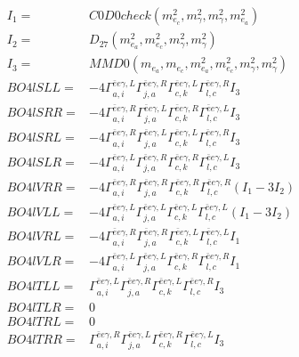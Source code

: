 \documentclass[A4,landscape]{article}
\begin{document}
\begin{align} 
I_1 = & C0D0check(m^2_{e_{{c}}}, m^2_{\gamma}, m^2_{\gamma}, m^2_{e_{{a}}}) \\ 
I_2 = & D_{27}(m^2_{e_{{a}}}, m^2_{e_{{c}}}, m^2_{\gamma}, m^2_{\gamma}) \\ 
I_3 = & MMD0(m_{e_{{a}}}, m_{e_{{c}}}, m^2_{e_{{a}}}, m^2_{e_{{c}}}, m^2_{\gamma}, m^2_{\gamma}) \\ 
  BO4lSLL= & -4  \Gamma^{\bar{e}e \gamma ,L}_{a, i} \Gamma^{\bar{e}e \gamma ,R}_{j, a} \Gamma^{\bar{e}e \gamma ,L}_{c, k} \Gamma^{\bar{e}e \gamma ,R}_{l, c} I_3 \\ 
  BO4lSRR= & -4  \Gamma^{\bar{e}e \gamma ,R}_{a, i} \Gamma^{\bar{e}e \gamma ,L}_{j, a} \Gamma^{\bar{e}e \gamma ,R}_{c, k} \Gamma^{\bar{e}e \gamma ,L}_{l, c} I_3 \\ 
  BO4lSRL= & -4  \Gamma^{\bar{e}e \gamma ,R}_{a, i} \Gamma^{\bar{e}e \gamma ,L}_{j, a} \Gamma^{\bar{e}e \gamma ,L}_{c, k} \Gamma^{\bar{e}e \gamma ,R}_{l, c} I_3 \\ 
  BO4lSLR= & -4  \Gamma^{\bar{e}e \gamma ,L}_{a, i} \Gamma^{\bar{e}e \gamma ,R}_{j, a} \Gamma^{\bar{e}e \gamma ,R}_{c, k} \Gamma^{\bar{e}e \gamma ,L}_{l, c} I_3 \\ 
  BO4lVRR= & -4  \Gamma^{\bar{e}e \gamma ,R}_{a, i} \Gamma^{\bar{e}e \gamma ,R}_{j, a} \Gamma^{\bar{e}e \gamma ,R}_{c, k} \Gamma^{\bar{e}e \gamma ,R}_{l, c} (I_1 - 3 I_2) \\ 
  BO4lVLL= & -4  \Gamma^{\bar{e}e \gamma ,L}_{a, i} \Gamma^{\bar{e}e \gamma ,L}_{j, a} \Gamma^{\bar{e}e \gamma ,L}_{c, k} \Gamma^{\bar{e}e \gamma ,L}_{l, c} (I_1 - 3 I_2) \\ 
  BO4lVRL= & -4  \Gamma^{\bar{e}e \gamma ,R}_{a, i} \Gamma^{\bar{e}e \gamma ,R}_{j, a} \Gamma^{\bar{e}e \gamma ,L}_{c, k} \Gamma^{\bar{e}e \gamma ,L}_{l, c} I_1 \\ 
  BO4lVLR= & -4  \Gamma^{\bar{e}e \gamma ,L}_{a, i} \Gamma^{\bar{e}e \gamma ,L}_{j, a} \Gamma^{\bar{e}e \gamma ,R}_{c, k} \Gamma^{\bar{e}e \gamma ,R}_{l, c} I_1 \\ 
  BO4lTLL= &  \Gamma^{\bar{e}e \gamma ,L}_{a, i} \Gamma^{\bar{e}e \gamma ,R}_{j, a} \Gamma^{\bar{e}e \gamma ,L}_{c, k} \Gamma^{\bar{e}e \gamma ,R}_{l, c} I_3 \\ 
  BO4lTLR= & 0 \\ 
  BO4lTRL= & 0 \\ 
  BO4lTRR= &  \Gamma^{\bar{e}e \gamma ,R}_{a, i} \Gamma^{\bar{e}e \gamma ,L}_{j, a} \Gamma^{\bar{e}e \gamma ,R}_{c, k} \Gamma^{\bar{e}e \gamma ,L}_{l, c} I_3 \\ 
\end{align} 
\end{document}
